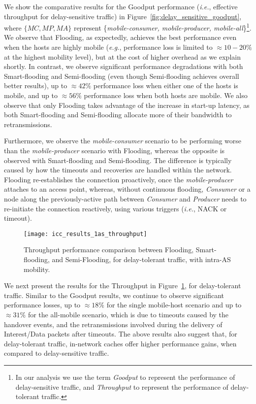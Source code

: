 \documentclass[conference]{IEEEtran}
\begin{document}
We show the comparative results for the Goodput performance (\emph{i.e.}, effective throughput for delay-sensitive traffic) in Figure~\ref{fig:delay_sensitive_goodput}, where $\{MC,MP,MA\}$ represent \{\emph{mobile-consumer, mobile-producer, mobile-all}\}\footnote{In our analysis we use the term \emph{Goodput} to represent the performance of delay-sensitive traffic, and \emph{Throughput} to represent the performance of delay-tolerant traffic.}. We observe that Flooding, as expectedly, achieves the best performance even when the hosts are highly mobile (\emph{e.g.}, performance loss is limited to $\approx 10-20\%$ at the highest mobility level), but at the cost of higher overhead as we explain shortly. In contrast, we observe significant performance degradations with both Smart-flooding and Semi-flooding (even though Semi-flooding achieves overall better results), up to $\approx 42\%$ performance loss when either one of the hosts is mobile, and up to $\approx 56\%$ performance loss when both hosts are mobile. We also observe that only Flooding takes advantage of the increase in start-up latency, as both Smart-flooding and Semi-flooding allocate more of their bandwidth to retransmissions.

Furthermore, we observe the \emph{mobile-consumer} scenario to be performing worse than the \emph{mobile-producer} scenario with Flooding, whereas the opposite is observed with Smart-flooding and Semi-flooding. The difference is typically caused by how the timeouts and recoveries are handled within the network. Flooding re-establishes the connection proactively, once the \emph{mobile-producer} attaches to an access point, whereas, without continuous flooding, \emph{Consumer} or a node along the previously-active path between \emph{Consumer} and \emph{Producer} needs to re-initiate the connection reactively, using various triggers (\emph{i.e.}, NACK or timeout). 
\begin{figure}[htb]
  \centering
\texttt{[image: icc\_results\_1as\_throughput]}\\
  \caption{Throughput performance comparison between Flooding, Smart-flooding, and Semi-Flooding, for delay-tolerant traffic, with intra-AS mobility.}\label{ThroughputResults}
\end{figure}

We next present the results for the Throughput in Figure~\ref{ThroughputResults}, for delay-tolerant traffic. Similar to the Goodput results, we continue to observe significant performance losses, up to $\approx 18\%$ for the single mobile-host scenario and up to $\approx 31\%$ for the all-mobile scenario, which is due to timeouts caused by the handover events, and the retransmissions involved during the delivery of Interest/Data packets after timeouts. The above results also suggest that, for delay-tolerant traffic, in-network caches offer higher performance gains, when compared to delay-sensitive traffic.
\end{document}
